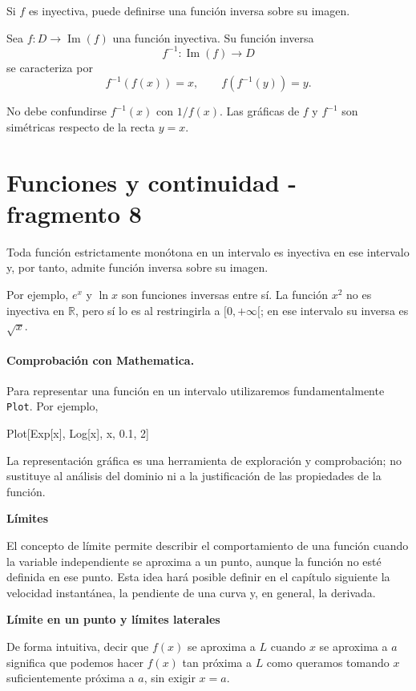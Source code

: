 Si $f$ es inyectiva, puede definirse una función inversa sobre su imagen.

\begin{definition}
Sea $f:D\to\operatorname{Im}(f)$ una función inyectiva. Su función inversa
\[
f^{-1}:\operatorname{Im}(f)\to D
\]
se caracteriza por
\[
f^{-1}(f(x))=x,
\qquad
f(f^{-1}(y))=y.
\]
\end{definition}

No debe confundirse $f^{-1}(x)$ con $1/f(x)$. Las gráficas de $f$ y $f^{-1}$ son simétricas respecto de la recta $y=x$.


\section{Funciones y continuidad - fragmento 8}
\begin{proposition}
Toda función estrictamente monótona en un intervalo es inyectiva en ese intervalo y, por tanto, admite función inversa sobre su imagen.
\end{proposition}

Por ejemplo, $e^x$ y $\ln x$ son funciones inversas entre sí. La función $x^2$ no es inyectiva en $\mathbb{R}$, pero sí lo es al restringirla a $[0,+\infty[$; en ese intervalo su inversa es $\sqrt{x}$.

\paragraph{Comprobación con Mathematica.}
Para representar una función en un intervalo utilizaremos fundamentalmente \texttt{Plot}. Por ejemplo,
\begin{mathematicacode}
Plot[{Exp[x], Log[x]}, {x, 0.1, 2}]
\end{mathematicacode}
La representación gráfica es una herramienta de exploración y comprobación; no sustituye al análisis del dominio ni a la justificación de las propiedades de la función.

\textbf{Límites}

El concepto de límite permite describir el comportamiento de una función cuando la variable independiente se aproxima a un punto, aunque la función no esté definida en ese punto. Esta idea hará posible definir en el capítulo siguiente la velocidad instantánea, la pendiente de una curva y, en general, la derivada.

\textbf{Límite en un punto y límites laterales}

De forma intuitiva, decir que $f(x)$ se aproxima a $L$ cuando $x$ se aproxima a $a$ significa que podemos hacer $f(x)$ tan próxima a $L$ como queramos tomando $x$ suficientemente próxima a $a$, sin exigir $x=a$.

